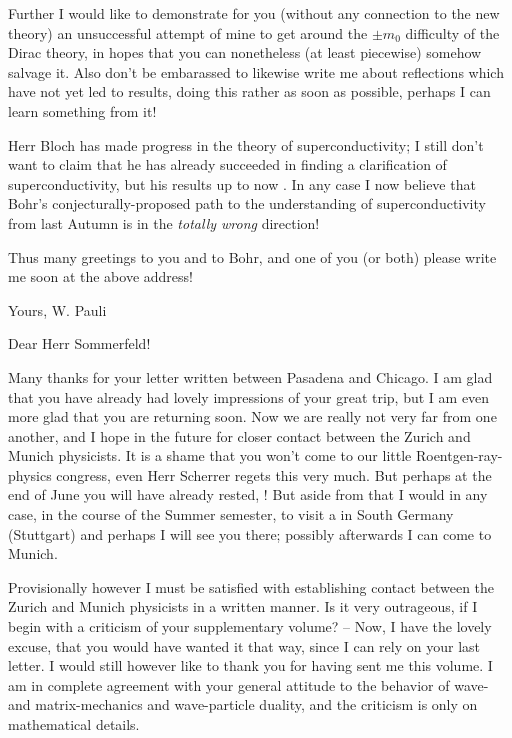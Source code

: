 \documentclass{article}
\begin{document}
Further I would like to demonstrate for you (without any connection to the new theory) an unsuccessful attempt of mine to get around the $\pm m_0$ difficulty of the Dirac theory, in hopes that you can nonetheless (at least piecewise) somehow salvage it. Also don't be embarassed to likewise write me about reflections which have not yet led to results, doing this rather as soon as possible, perhaps I can learn something from it!

Herr Bloch has made progress in the theory of superconductivity; I still don't want to claim that he has already succeeded in finding a clarification of superconductivity, but his results up to now . In any case I now believe that Bohr's conjecturally-proposed path to the understanding of superconductivity from last Autumn is in the \textit{totally wrong} direction!

Thus many greetings to you and to Bohr, and one of you (or both) please write me soon at the above address!

Yours,
W. Pauli

\date{May 16, 1929}

Dear Herr Sommerfeld!

Many thanks for your letter written between Pasadena and Chicago. I am glad that you have already had lovely impressions of your great trip, but I am even more glad that you are returning soon. Now we are really not very far from one another, and I hope in the future for closer contact between the Zurich and Munich physicists. It is a shame that you won't come to our little Roentgen-ray-physics congress, even Herr Scherrer regets this very much. But perhaps at the end of June you will have already rested, ! But aside from that I would in any case, in the course of the Summer semester, to visit a  in South Germany (Stuttgart) and perhaps I will see you there; possibly afterwards I can come to Munich.

Provisionally however I must be satisfied with establishing contact between the Zurich and Munich physicists in a written manner. Is it very outrageous, if I begin with a criticism of your supplementary volume? -- Now, I have the lovely excuse, that you would have wanted it that way, since I can rely on your last letter. I would still however like to thank you for having sent me this volume. I am in complete agreement with your general attitude to the behavior of wave- and matrix-mechanics and wave-particle duality, and the criticism is only on mathematical details.
\end{document}
